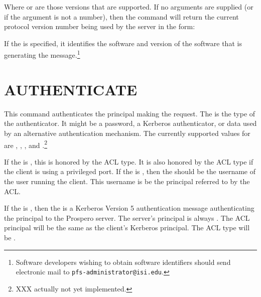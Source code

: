 Where  or
\lit{-} are those
versions that are supported.   
If no arguments are supplied (or if the argument is not a 
number), then the  command will return the current
protocol version number being used by the server in the form:

\begin{command}
    \zoos{}\zooe 
\end{command}

If the  is specified, it identifies
the software and version of the software that is generating the
message.\footnote{Software developers wishing to obtain software
identifiers should send electronic mail to {\tt pfs-administrator@isi.edu}.}

\section{AUTHENTICATE}

\begin{command}
  \commandsize {}  
	 \zoms{}\zome
\end{command}

This command authenticates the principal making the request.  The
 is the type of the authenticator.  It might
be a password, a Kerberos 
authenticator, or data used by an alternative authentication
mechanism.  The currently supported values for
 are , ,
, and .\footnote{XXX  actually
not yet implemented.}

If the  is , this is
honored by the  ACL type.  It is also honored by the  ACL
type if the client is
using a privileged port.  If the  is 
, then the  should be
the username of the user running the client.  This username is be the
principal referred to by the ACL.  

If the  is , then the
 is a Kerberos Version 5 authentication message
authenticating the principal to the Prospero server.  The server's
principal is always .  The ACL principal will be the
same as the client's Kerberos principal.  The ACL type will be
 .

